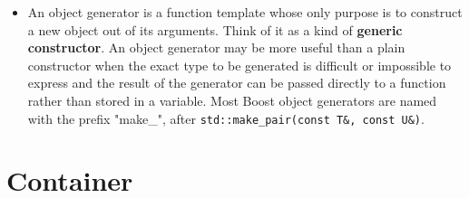 \documentclass[a4paper,11pt,twoside]{book}
\begin{document}
\begin{itemize}
	\item An object generator is a function template whose only purpose is to construct a new object out of its arguments. Think of it as a kind of \textbf{generic constructor}. An object generator may be more useful than a plain constructor when the exact type to be generated is difficult or impossible to express and the result of the generator can be passed directly to a function rather than stored in a variable. Most Boost object generators are named with the prefix "make\_", after \texttt{std::make\_pair(const T\&, const U\&)}.
	
\end{itemize}


\section{Container}
\end{document}

